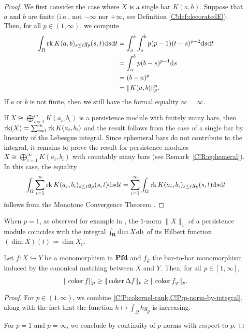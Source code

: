 \begin{proof}
  We first consider the case where $X$ is a single bar $K(a, b)$. Suppose that $a$ and $b$ are finite (i.e., not $-\infty$ nor $+\infty$, see Definition \ref{C!def:decoratedE}). Then, for all $p \in (1, \infty)$, we compute
  \begin{align*}
    \int_\Omega \operatorname{rk} K(a, b)_{s \leq t} g_p(s, t) \text{d}s \text{d}t & = \int_a^b \int_s^b p(p - 1)(t - s)^{p - 2} \text{d}s \text{d}t \\
    & = \int_a^b p (b - s)^{p - 1} \text{d}s \\
    & = (b - a)^p \\
    & = \| K(a, b) \|_p^p.
  \end{align*}
  If $a$ or $b$ is not finite, then we still have the formal equality $\infty = \infty$.

  If $X\cong \bigoplus_{i=1}^m K(a_i,b_i)$ is a persistence module with finitely many bars, then $\operatorname{rk} (X)=\sum_{i=1}^m \operatorname{rk} K(a_i,b_i)$ and the result follows from the case of a single bar by linearity of the Lebesgue integral. 
  Since ephemeral bars do not contribute to the integral, it remains to prove the result for persistence modules $X\cong \bigoplus_{i=1}^\infty K(a_i,b_i)$ with countably many bars (see Remark~\ref{C!R:ephemeral}).
  In this case, the equality 
  \[
    \int_\Omega \sum_{i=1}^\infty \operatorname{rk} K(a_i, b_i)_{s \leq t} g_p(s, t) \text{d}s \text{d}t = \sum_{i=1}^\infty \int_\Omega \operatorname{rk} K(a_i, b_i)_{s \leq t} g_p(s, t) \text{d}s \text{d}t
  \]
  follows from the Monotone Convergence Theorem \cite[Thm.~2.14]{folland1999real}.
\end{proof}

\begin{remark}\label{C!rmk:int-norm1}
  When $p=1$, as observed for example in \cite{BSS2023}, the $1$-norm $\| X \|_1$ of a persistence module coincides with the integral $\int_{\mathbf{R}} \dim X_{t} \textnormal{d}t$ of its Hilbert function $(\dim X)(t)\coloneqq \dim X_t$. 
\end{remark}

\begin{theorem}
\label{C!thm:cost-coker-btb}
  Let $f \colon X \hookrightarrow Y$ be a monomorphism in $\operatorname{\mathbf{Pfd}}$ and $f_\varphi$ the bar-to-bar monomorphism induced by the canonical matching between $X$ and $Y$. Then, for all $p \in [1, \infty]$,
  \[
    \| \operatorname{coker} f \|_p \geq \| \operatorname{coker} \Delta f \|_p \geq \| \operatorname{coker} f_\varphi \|_p.
  \]
\end{theorem}

\begin{proof}
  For $p \in (1, \infty)$, we combine \cref{C!P:cokernel-rank,C!P:p-norm-by-integral}, along with the fact that the function $h \mapsto \int_\Omega h g_p$ is increasing.

  For $p = 1$ and $p = \infty$, we conclude by continuity of $p$-norms with respect to $p$.
\end{proof}


